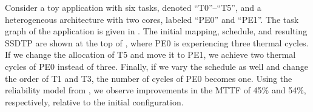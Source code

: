 Consider a toy application with six tasks, denoted ``T0''--``T5'', and a heterogeneous architecture with two cores, labeled ``PE0'' and ``PE1''. The task graph of the application is given in . The initial mapping, schedule, and resulting SSDTP are shown at the top of , where PE0 is experiencing three thermal cycles. If we change the allocation of T5 and move it to PE1, we achieve two thermal cycles of PE0 instead of three. Finally, if we vary the schedule as well and change the order of T1 and T3, the number of cycles of PE0 becomes one. Using the reliability model from , we observe improvements in the MTTF of 45\% and 54\%, respectively, relative to the initial configuration.
